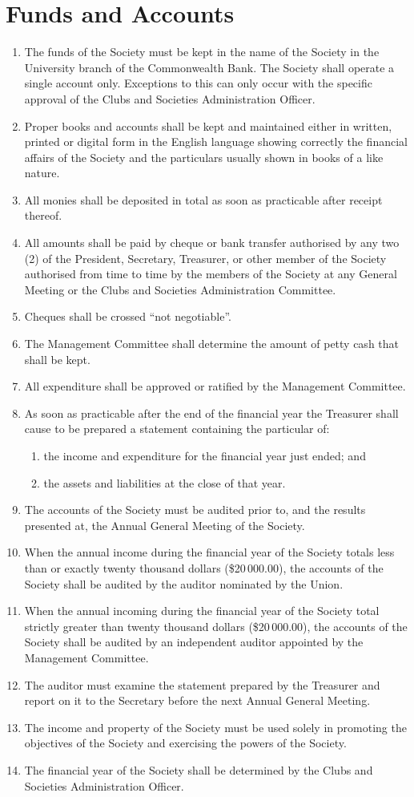 \documentclass[a4paper]{article}
\newcommand*{\sectionr}[1]{{\raggedright \section{#1}}}
\begin{document}
\sectionr{Funds and Accounts}
\begin{enumerate}
\item The funds of the Society must be kept in the name of the Society in the University branch of the Commonwealth Bank. The Society shall operate a single account only. Exceptions to this can only occur with the specific approval of the Clubs and Societies Administration Officer.
\item Proper books and accounts shall be kept and maintained either in written, printed or digital form in the English language showing correctly the financial affairs of the Society and the particulars usually shown in books of a like nature.
\item All monies shall be deposited in total as soon as practicable after receipt thereof.
\item All amounts shall be paid by cheque or bank transfer authorised by any two (2) of the President, Secretary, Treasurer, or other member of the Society authorised from time to time by the members of the Society at any General Meeting or the Clubs and Societies Administration Committee.
\item Cheques shall be crossed ``not negotiable''.
\item The Management Committee shall determine the amount of petty cash that shall be kept.
\item All expenditure shall be approved or ratified by the Management Committee.
\item As soon as practicable after the end of the financial year the Treasurer shall cause to be prepared a statement containing the particular of:
	\begin{enumerate}
	\item the income and expenditure for the financial year just ended; and
	\item the assets and liabilities at the close of that year.
	\end{enumerate}
\item The accounts of the Society must be audited prior to, and the results presented at, the Annual General Meeting of the Society.
\item When the annual income during the financial year of the Society totals less than or exactly twenty thousand dollars (\$20\,000.00), the accounts of the Society shall be audited by the auditor nominated by the Union.
\item When the annual incoming during the financial year of the Society total strictly greater than twenty thousand dollars (\$20\,000.00), the accounts of the Society shall be audited by an independent auditor appointed by the Management Committee.
\item The auditor must examine the statement prepared by the Treasurer and report on it to the Secretary before the next Annual General Meeting.
\item The income and property of the Society must be used solely in promoting the objectives of the Society and exercising the powers of the Society.
\item The financial year of the Society shall be determined by the Clubs and Societies Administration Officer.
\end{enumerate}
\end{document}

